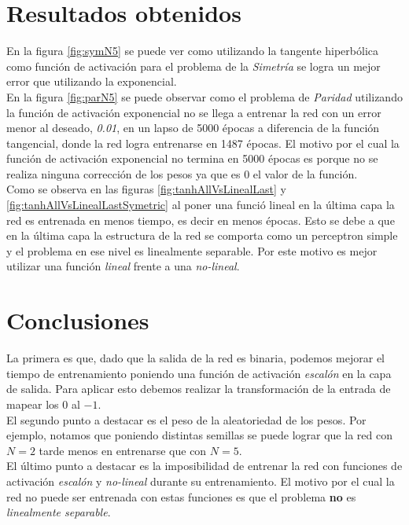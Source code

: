 \documentclass{sig-alternate}
\begin{document}
\section*{Resultados obtenidos}

	En la figura \ref{fig:symN5} se puede ver como utilizando la tangente hiperb\'olica como funci\'on de activaci\'on para el problema de la \textit{Simetr\'ia} se logra un mejor error que utilizando la exponencial.\\
	En la figura \ref{fig:parN5} se puede observar como el problema de \textit{Paridad} utilizando la funci\'on de activaci\'on exponencial no se llega a entrenar la red con un error menor al deseado, \textit{0.01}, en un lapso de 5000 \'epocas a diferencia de la funci\'on tangencial, donde la red logra entrenarse en 1487 \'epocas. El motivo por el cual la funci\'on de activaci\'on exponencial no termina en 5000 \'epocas es porque no se realiza ninguna correcci\'on de los pesos ya que es 0 el valor de la funci\'on. \\
	Como se observa en las figuras \ref{fig:tanhAllVsLinealLast} y \ref{fig:tanhAllVsLinealLastSymetric} al poner una funci\'o lineal en la \'ultima capa la red es entrenada en menos tiempo, es decir en menos \'epocas. Esto se debe a que en la \'ultima capa la estructura de la red se comporta como un perceptron simple y el problema en ese nivel es linealmente separable. Por este motivo es mejor utilizar una funci\'on \textit{lineal} frente a una \textit{no-lineal}.

\section*{Conclusiones}

	La primera es que, dado que la salida de la red es binaria, podemos mejorar el tiempo de entrenamiento poniendo una funci\'on de activaci\'on \textit{escal\'on} en la capa de salida. Para aplicar esto debemos realizar la transformaci\'on de la entrada de mapear los $0$ al $-1$.\\
	El segundo punto a destacar es el peso de la aleatoriedad de los pesos. Por ejemplo, notamos que poniendo distintas semillas se puede lograr que la red con $N=2$ tarde menos en entrenarse que con $N=5$.\\
	El \'ultimo punto a destacar es la imposibilidad de entrenar la red con funciones de activaci\'on \textit{escal\'on} y \textit{no-lineal} durante su entrenamiento. El motivo por el cual la red no puede ser entrenada con estas funciones es que el problema \textbf{no} es \textit{linealmente separable}.
\end{document}
